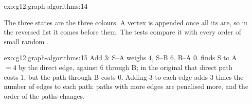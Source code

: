 \begin{solution}{exo:g12:graph-algorithms:14}
\smallskip\noindent\hspace*{2em}

\noindent\hspace*{4em}

\noindent\hspace*{4em}

\noindent\hspace*{6em}

\noindent\hspace*{6em}

\noindent\hspace*{8em}

\noindent\hspace*{10em}

\noindent\hspace*{8em}

\noindent\hspace*{10em}

\noindent\hspace*{6em}

\noindent\hspace*{6em}

\noindent\hspace*{4em}

\noindent\hspace*{6em}

\noindent\hspace*{8em}

\noindent\hspace*{4em}

\smallskip\noindent The three states are the three colours. A vertex is appended once all its  are, so in
the reversed list it comes before them. The tests compare it with every order of small random .
\end{solution}

\begin{solution}{exo:g12:graph-algorithms:15}
Add $3$: S--A weighs $4$, S--B $6$, B--A $0$.  finds S to A $= 4$ by the direct edge, against $6$
through B; in the original  that direct path costs $1$, but the path through B costs $0$. Adding $3$ to each
edge adds $3$ times the number of edges to each path: paths with more edges are penalised more, and the order of the
paths changes.
\end{solution}

